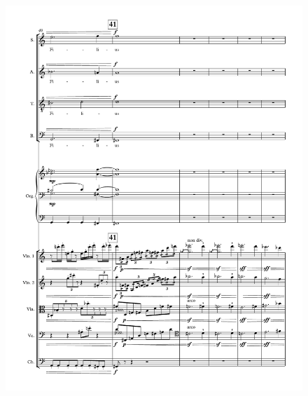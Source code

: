 \begin{figure}[htbp]
    \centering
	\includegraphics[width=6.5in]{figures/Stabat_Mater_10.pdf}
\end{figure}

